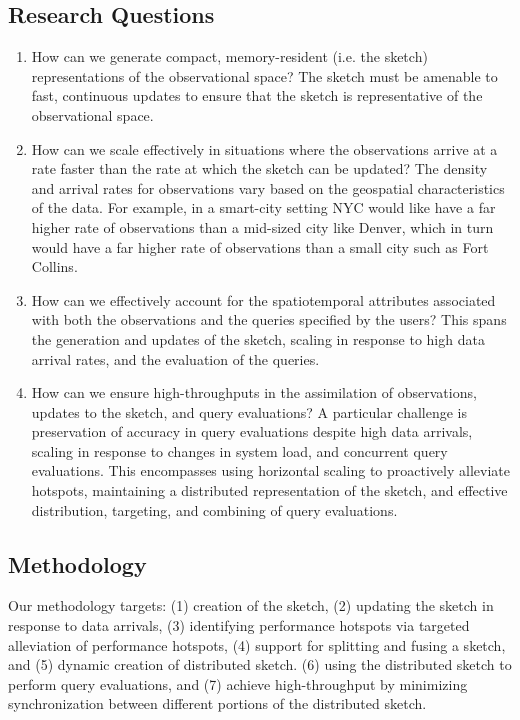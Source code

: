 \subsection{Research Questions}
\begin{enumerate}
\item   How can we generate compact, memory-resident (i.e. the sketch) representations of the observational space? The sketch must be amenable to fast, continuous updates to ensure that the sketch is representative of the observational space.
\item   How can we scale effectively in situations where the observations arrive at a rate faster than the rate at which the sketch can be updated? The density and arrival rates for observations vary based on the geospatial characteristics of the data. For example, in a smart-city setting NYC would like have a far higher rate of observations than a mid-sized city like Denver, which in turn would have a far higher rate of observations than a small city such as Fort Collins.
\item   How can we effectively account for the spatiotemporal attributes associated with both the observations and the queries specified by the users? This spans the generation and updates of the sketch, scaling in response to high data arrival rates, and the evaluation of the queries.
\item   How can we ensure high-throughputs in the assimilation of observations, updates to the sketch, and query evaluations? A particular challenge is preservation of accuracy in query evaluations despite high data arrivals, scaling in response to changes in system load, and concurrent query evaluations.  This encompasses using horizontal scaling to proactively alleviate hotspots, maintaining a distributed representation of the sketch, and effective distribution, targeting, and combining of query evaluations.
\end{enumerate}

\subsection{Methodology}
Our methodology targets: (1) creation of the sketch, (2) updating the sketch in response to data arrivals, (3) identifying performance hotspots via targeted alleviation of performance hotspots, (4) support for splitting and fusing a sketch, and (5) dynamic creation of distributed sketch. (6) using the distributed sketch to perform query evaluations, and (7) achieve high-throughput by minimizing synchronization between different portions of the distributed sketch. 

